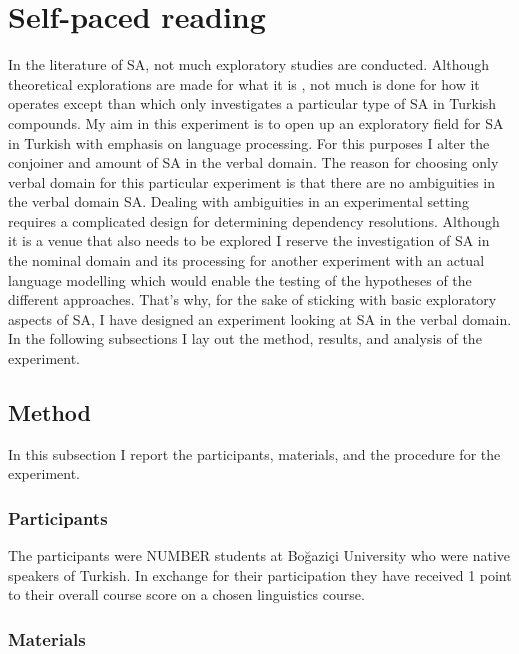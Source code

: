 \section{Self-paced reading}

In the literature of SA, not much exploratory studies are conducted. Although theoretical explorations are made for what it is \citep{kornfilt1996some,kornfilt2012revisiting,kabak2007turkish,broadwell2008turkish}, not much is done for how it operates except than \cite{kharytonava2012word,kharytonava2012taming} which only investigates a particular type of SA in Turkish compounds. My aim in this experiment is to open up an exploratory field for SA in Turkish with emphasis on language processing. For this purposes I alter the conjoiner and amount of SA in the verbal domain. The reason for choosing only verbal domain for this particular experiment is that there are no ambiguities in the verbal domain SA. Dealing with ambiguities in an experimental setting requires a complicated design for determining dependency resolutions. Although it is a venue that also needs to be explored I reserve the investigation of SA in the nominal domain and its processing for another experiment with an actual language modelling which would enable the testing of the hypotheses of the different approaches. That's why, for the sake of sticking with basic exploratory aspects of SA, I have designed an experiment looking at SA in the verbal domain. In the following subsections I lay out the method, results, and analysis of the experiment.

\subsection{Method}
In this subsection I report the participants, materials, and the procedure for the experiment.

\subsubsection{Participants}

The participants were NUMBER students at Boğaziçi University who were native speakers of Turkish. In exchange for their participation they have received 1 point to their overall course score on a chosen linguistics course.

\subsubsection{Materials}

